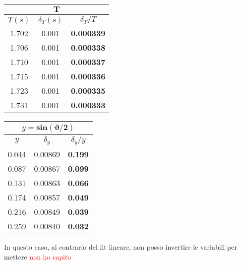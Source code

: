 \documentclass{article}
\begin{document}
\begin{minipage}{0.5\textwidth}
	\begin{table}[H]
		\centering
		\begin{tabular}{@{}ccc@{}}
			\multicolumn{3}{c}{$\mathbf{T}$} \\ \midrule
			$T(s)$ & $\delta_T (s)$ & $\delta_T / T$ \\ \midrule
			1.702 & 0.001 & \textbf{0.000339} \\
			1.706 & 0.001 & \textbf{0.000338} \\
			1.710 & 0.001 & \textbf{0.000337} \\
			1.715 & 0.001 & \textbf{0.000336} \\
			1.723 & 0.001 & \textbf{0.000335} \\
			1.731 & 0.001 & \textbf{0.000333}  \\ \bottomrule   
		\end{tabular}
	\end{table}
\end{minipage}
\begin{minipage}{0.5\textwidth}
	\begin{table}[H]
		\centering
		\begin{tabular}{@{}ccc@{}}
			
			\multicolumn{3}{c}{$y = \mathbf{sin{\left(\vartheta/2\right)}}$} \\ \midrule
			$y$ & $\delta_y$ & $\delta_y / y$ \\ \midrule
			0.044 & 0.00869 & \textbf{0.199} \\
			0.087 & 0.00867 & \textbf{0.099} \\
			0.131 & 0.00863 & \textbf{0.066} \\
			0.174 & 0.00857 & \textbf{0.049} \\
			0.216 & 0.00849 & \textbf{0.039} \\
			0.259 & 0.00840 & \textbf{0.032}  \\ \bottomrule  
		\end{tabular}
	\end{table}
\end{minipage}
\vspace{1cm}


\noindent
In questo caso, al contrario del fit lineare, non posso invertire le variabili per mettere \textcolor{red}{non ho capito}
\end{document}
